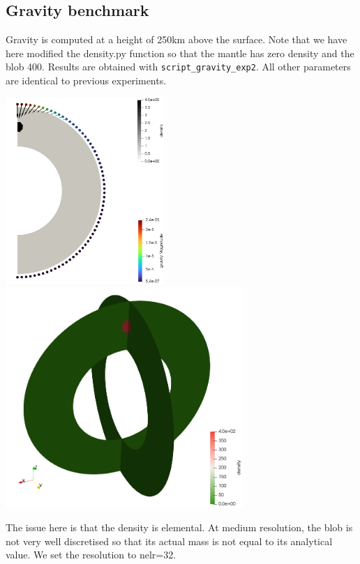 \newpage
\subsection*{Gravity benchmark}

Gravity is computed at a height of 250km above the surface. 
Note that we have here modified the {\python density.py} function so 
that the mantle has zero density and the blob 400. 
Results are obtained with {\tt script\_gravity\_exp2}.
All other parameters are identical to previous experiments.

\begin{center}
\includegraphics[width=6cm]{python_codes/fieldstone_152/RESULTS/exp2/gravity/gravity.png}
\includegraphics[width=9cm]{python_codes/fieldstone_152/RESULTS/exp2/gravity/fourslices.png}
\end{center}

The issue here is that the density is elemental. At medium resolution, the blob is not 
very well discretised so that its actual mass is not equal to its analytical value. 
We set the resolution to {\python nelr=32}.

